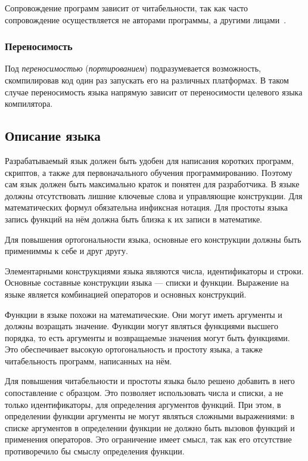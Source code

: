             Сопровождение программ зависит от читабельности, так как часто сопровождение осуществляется не авторами программы, а другими лицами~\cite{langs}.
        \subsubsection{Переносимость}
            Под \textit{переносимостью} (\textit{портированием}) подразумевается возможность, скомпилировав код один раз запускать его на различных платформах.
            В таком случае переносимость языка напрямую зависит от переносимости целевого языка компилятора.
    \subsection{Описание языка}
        Разрабатываемый язык должен быть удобен для написания коротких программ, скриптов, а также для первоначального обучения программированию.
        Поэтому сам язык должен быть максимально краток и понятен для разработчика.
        В языке должны отсутствовать лишние ключевые слова и управляющие конструкции.
        Для математических формул обязательна инфиксная нотация.
        Для простоты языка запись функций на нём должна быть близка к их записи в математике.

        Для повышения ортогональности языка, основные его конструкции должны быть примениммы к себе и друг другу.

        Элементарными конструкциями языка являются числа, идентификаторы и строки.
        Основные составные конструкции языка --- списки и функции.
        Выражение на языке является комбинацией операторов и основных конструкций.

        Функции в языке похожи на математические.
        Они могут иметь аргументы и должны возращать значение.
        Функции могут являться функциями высшего порядка, то есть аргументы и возвращаемые значения могут быть функциями.
        Это обеспечивает высокую ортогональность и простоту языка, а также читабельность программ, написанных на нём.

        Для повышения читабельности и простоты языка было решено добавить в него сопоставление с образцом.
        Это позволяет использовать числа и списки, а не только идентификаторы, для определения аргументов функций.
        При этом, в определении функции аргументы не могут являться сложными выражениями: в списке аргументов в определении функции не должно быть вызовов функций и применения операторов.
        Это ограничение имеет смысл, так как его отсутствие противоречило бы смыслу определения функции.


